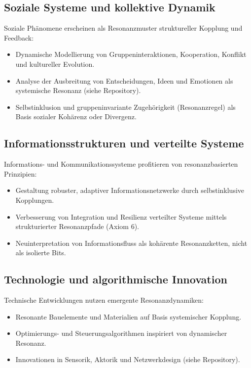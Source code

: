 \documentclass[12pt]{iopart}
\begin{document}
\subsection{Soziale Systeme und kollektive Dynamik}

Soziale Phänomene erscheinen als Resonanzmuster struktureller Kopplung und Feedback:
\begin{itemize}
	\item Dynamische Modellierung von Gruppeninteraktionen, Kooperation, Konflikt und kultureller Evolution.
	\item Analyse der Ausbreitung von Entscheidungen, Ideen und Emotionen als systemische Resonanz (siehe Repository).
	\item Selbstinklusion und gruppeninvariante Zugehörigkeit (Resonanzregel) als Basis sozialer Kohärenz oder Divergenz.
\end{itemize}

\subsection{Informationsstrukturen und verteilte Systeme}

Informations- und Kommunikationssysteme profitieren von resonanzbasierten Prinzipien:
\begin{itemize}
	\item Gestaltung robuster, adaptiver Informationsnetzwerke durch selbstinklusive Kopplungen.
	\item Verbesserung von Integration und Resilienz verteilter Systeme mittels strukturierter Resonanzpfade (Axiom 6).
	\item Neuinterpretation von Informationsfluss als kohärente Resonanzketten, nicht als isolierte Bits.
\end{itemize}

\subsection{Technologie und algorithmische Innovation}

Technische Entwicklungen nutzen emergente Resonanzdynamiken:
\begin{itemize}
	\item Resonante Bauelemente und Materialien auf Basis systemischer Kopplung.
	\item Optimierungs- und Steuerungsalgorithmen inspiriert von dynamischer Resonanz.
	\item Innovationen in Sensorik, Aktorik und Netzwerkdesign (siehe Repository).
\end{itemize}
\end{document}
